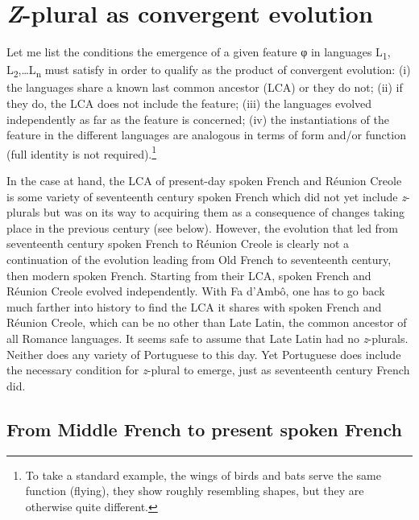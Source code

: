 \documentclass[output=paper]{langscibook}
\begin{document}
\section{\textit{Z}-plural as convergent evolution}
\label{sec:kihm:5}

Let me list the conditions the emergence of a given feature φ in languages L\textsubscript{1}, L\textsubscript{2},…L\textsubscript{n} must satisfy in order to qualify as the product of convergent evolution: (i) the languages share a known last common ancestor (LCA) or they do not; (ii) if they do, the LCA does not include the feature; (iii) the languages evolved independently as far as the feature is concerned; (iv) the instantiations of the feature in the different languages are analogous in terms of form and/or function (full identity is not required).\footnote{To take a standard example, the wings of birds and bats serve the same function (flying), they show roughly resembling shapes, but they are otherwise quite different.}

In the case at hand, the LCA of present-day spoken French and Réunion Creole is some variety of seventeenth century spoken French which did not yet include \textit{z}{}-plurals but was on its way to acquiring them as a consequence of changes taking place in the previous century (see below). However, the evolution that led from seventeenth century spoken French to Réunion Creole is clearly not a continuation of the evolution leading from Old French to seventeenth century, then modern spoken French. Starting from their LCA, spoken French and Réunion Creole evolved independently. With Fa d’Ambô, one has to go back much farther into history to find the LCA it shares with spoken French and Réunion Creole, which can be no other than Late Latin, the common ancestor of all Romance languages. It seems safe to assume that Late Latin had no \textit{z}{}-plurals. Neither does any variety of Portuguese to this day. Yet Portuguese does include the necessary condition for \textit{z}{}-plural to emerge, just as seventeenth century French did.

\subsection{From Middle French to present spoken French}
\label{sec:kihm:5.1}
\end{document}
